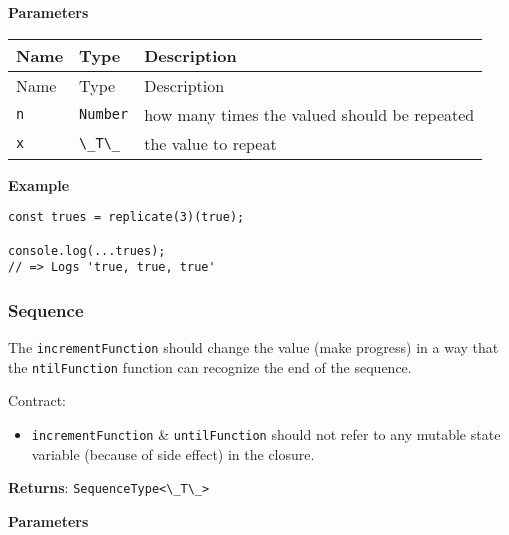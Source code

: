 \textbf{Parameters}

\begin{longtable}[]{
  >{\raggedright\arraybackslash}p{}
  >{\raggedright\arraybackslash}p{}
  >{\raggedright\arraybackslash}p{}@{}}

\toprule\noalign{}
Name & Type & Description \\
\midrule\noalign{}
\endfirsthead
\toprule\noalign{}
Name & Type & Description \\
\midrule\noalign{}
\endhead
\bottomrule\noalign{}
\endlastfoot
\passthrough{\lstinline!n!} & \passthrough{\lstinline!Number!} & how
many times the valued should be repeated \\
\passthrough{\lstinline!x!} & \passthrough{\lstinline!\_T\_!} & the
value to repeat \\
\end{longtable}

\textbf{Example}

\begin{lstlisting}[label=ccbcf172-af5e-478c-8044-fbe706545e55]
const trues = replicate(3)(true);
                                 
console.log(...trues);
// => Logs 'true, true, true'
\end{lstlisting}

\hypertarget{b80b5d30-4053-4091-842b-ddc5e8cb7195}{%
\subsubsection{Sequence}\label{b80b5d30-4053-4091-842b-ddc5e8cb7195}}

The \passthrough{\lstinline!incrementFunction!} should change the value
(make progress) in a way that the \passthrough{\lstinline!ntilFunction!}
function can recognize the end of the sequence.

Contract:

\begin{itemize}
\tightlist
\item
  \passthrough{\lstinline!incrementFunction!} \&
  \passthrough{\lstinline!untilFunction!} should not refer to any
  mutable state variable (because of side effect) in the closure.
\end{itemize}

\textbf{Returns}: \passthrough{\lstinline!SequenceType<\_T\_>!}

\textbf{Parameters}

